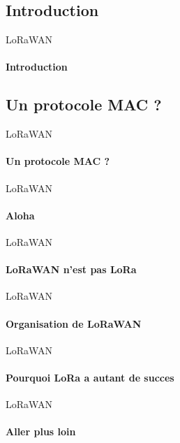 \subsection{Introduction}

\begin{frame}{LoRaWAN}
\framesubtitle{Introduction}

\end{frame}

\subsection{Un protocole MAC ?}

\begin{frame}{LoRaWAN}
\framesubtitle{Un protocole MAC ?}
\end{frame}

\begin{frame}{LoRaWAN}
\framesubtitle{Aloha}
\end{frame}

\begin{frame}{LoRaWAN}
\framesubtitle{LoRaWAN n'est pas LoRa}
\end{frame}

\begin{frame}{LoRaWAN}
\framesubtitle{Organisation de LoRaWAN}
\end{frame}

\begin{frame}{LoRaWAN}
\framesubtitle{Pourquoi LoRa a autant de succes}
\end{frame}

\begin{frame}{LoRaWAN}
\framesubtitle{Aller plus loin}
\end{frame}

